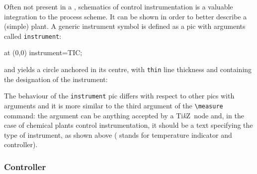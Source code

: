\documentclass[12pt]{article}						%
\newcommand*{\ac}[1]{%
		\textsmaller{#1}%
	}
\newcommand*{\chpn}[1]{\texttt{#1}}				%
\newcommand*{\chpp}[1]{\texttt{#1}}				%
\newcommand*{\TikZ}{Ti\textit{k}Z}
\begin{document}
Often not present in a \ac{PFD}, schematics of control instrumentation is a
valuable integration to the process scheme. It can be shown in order to better
describe a (simple) plant. A generic instrument symbol is defined as a pic with
arguments called \chpp{instrument}:
\begin{chpcode}
	\pic at (0,0) {instrument=TIC};
\end{chpcode}
and yields a circle anchored in its centre, with \verb|thin| line thickness and
containing the designation of the instrument:
\begin{center}
\end{center}

The behaviour of the \chpp{instrument} pic differs with respect to other pics
with arguments and it is more similar to the third argument of the
\verb|\measure| command: the argument can be anything accepted by a \TikZ\ node
and, in the case of chemical plants control instrumentation, it should be a text
specifying the type of instrument, as shown above (\ac{TIC} stands for
temperature indicator and controller).

\subsubsection{Controller}
\end{document}
